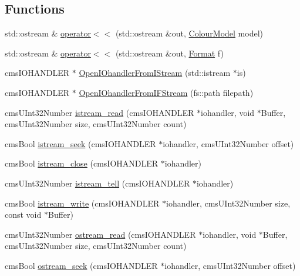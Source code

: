 \subsection*{Functions}
\begin{DoxyCompactItemize}
\item 
std\+::ostream \& \hyperlink{namespace_c_m_s_aebe3bd3845d84746f27134435fcaadbe}{operator$<$$<$} (std\+::ostream \&out, \hyperlink{namespace_c_m_s_a9cb18b5da51a22c3c9dd25a5c9048e42}{Colour\+Model} model)
\item 
std\+::ostream \& \hyperlink{namespace_c_m_s_a0d812bc6465a5fef515e13517dbb14c4}{operator$<$$<$} (std\+::ostream \&out, \hyperlink{class_c_m_s_1_1_format}{Format} f)
\item 
cms\+I\+O\+H\+A\+N\+D\+L\+ER $\ast$ \hyperlink{namespace_c_m_s_a618226eaa9bf97c8c23669c516be6d4e}{Open\+I\+Ohandler\+From\+I\+Stream} (std\+::istream $\ast$is)
\item 
cms\+I\+O\+H\+A\+N\+D\+L\+ER $\ast$ \hyperlink{namespace_c_m_s_ad1b15f2bd898c5c4e96ab247fb26575c}{Open\+I\+Ohandler\+From\+I\+F\+Stream} (fs\+::path filepath)
\item 
cms\+U\+Int32\+Number \hyperlink{namespace_c_m_s_a88c40f3fde62e521d5f3b4055e6854e6}{istream\+\_\+read} (cms\+I\+O\+H\+A\+N\+D\+L\+ER $\ast$iohandler, void $\ast$Buffer, cms\+U\+Int32\+Number size, cms\+U\+Int32\+Number count)
\item 
cms\+Bool \hyperlink{namespace_c_m_s_a55b53b00daedc8b76eba456e43713dd6}{istream\+\_\+seek} (cms\+I\+O\+H\+A\+N\+D\+L\+ER $\ast$iohandler, cms\+U\+Int32\+Number offset)
\item 
cms\+Bool \hyperlink{namespace_c_m_s_a60036a5e1db6c4320d3ce599758c9101}{istream\+\_\+close} (cms\+I\+O\+H\+A\+N\+D\+L\+ER $\ast$iohandler)
\item 
cms\+U\+Int32\+Number \hyperlink{namespace_c_m_s_a9e1e064622cf44c9e8958a37c0bae3e4}{istream\+\_\+tell} (cms\+I\+O\+H\+A\+N\+D\+L\+ER $\ast$iohandler)
\item 
cms\+Bool \hyperlink{namespace_c_m_s_a3562813bdb675436999b19d1b51a986f}{istream\+\_\+write} (cms\+I\+O\+H\+A\+N\+D\+L\+ER $\ast$iohandler, cms\+U\+Int32\+Number size, const void $\ast$Buffer)
\item 
cms\+U\+Int32\+Number \hyperlink{namespace_c_m_s_ac7b7b13d2c01af24cbf3fa7587e24c23}{ostream\+\_\+read} (cms\+I\+O\+H\+A\+N\+D\+L\+ER $\ast$iohandler, void $\ast$Buffer, cms\+U\+Int32\+Number size, cms\+U\+Int32\+Number count)
\item 
cms\+Bool \hyperlink{namespace_c_m_s_a42537c0a11f8f118b0380d202ff24430}{ostream\+\_\+seek} (cms\+I\+O\+H\+A\+N\+D\+L\+ER $\ast$iohandler, cms\+U\+Int32\+Number offset)

\end{DoxyCompactItemize}
